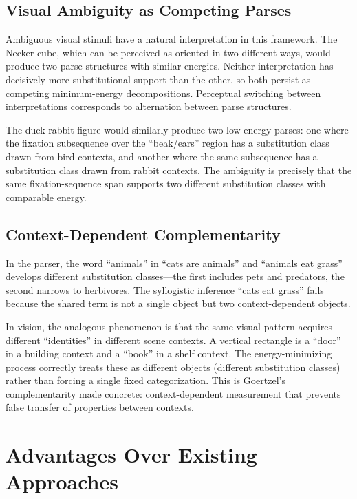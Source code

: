 \documentclass[11pt,a4paper]{article}
\begin{document}
\subsection{Visual Ambiguity as Competing Parses}

Ambiguous visual stimuli have a natural interpretation in this framework. The Necker cube, which can be perceived as oriented in two different ways, would produce two parse structures with similar energies. Neither interpretation has decisively more substitutional support than the other, so both persist as competing minimum-energy decompositions. Perceptual switching between interpretations corresponds to alternation between parse structures.

The duck-rabbit figure would similarly produce two low-energy parses: one where the fixation subsequence over the ``beak/ears'' region has a substitution class drawn from bird contexts, and another where the same subsequence has a substitution class drawn from rabbit contexts. The ambiguity is precisely that the same fixation-sequence span supports two different substitution classes with comparable energy.

\subsection{Context-Dependent Complementarity}

In the parser, the word ``animals'' in ``cats are animals'' and ``animals eat grass'' develops different substitution classes---the first includes pets and predators, the second narrows to herbivores. The syllogistic inference ``cats eat grass'' fails because the shared term is not a single object but two context-dependent objects.

In vision, the analogous phenomenon is that the same visual pattern acquires different ``identities'' in different scene contexts. A vertical rectangle is a ``door'' in a building context and a ``book'' in a shelf context. The energy-minimizing process correctly treats these as different objects (different substitution classes) rather than forcing a single fixed categorization. This is Goertzel's complementarity made concrete: context-dependent measurement that prevents false transfer of properties between contexts.

\section{Advantages Over Existing Approaches}
\end{document}
